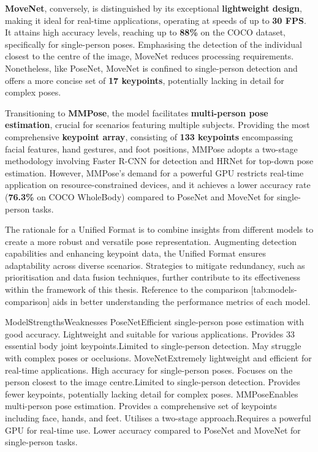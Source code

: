 {\bf MoveNet}, conversely, is distinguished by its exceptional {\bf lightweight design}, making it ideal for real-time applications, operating at speeds of up to {\bf 30 FPS}. It attains high accuracy levels, reaching up to {\bf 88\%} on the COCO dataset, specifically for single-person poses. Emphasising the detection of the individual closest to the centre of the image, MoveNet reduces processing requirements. Nonetheless, like PoseNet, MoveNet is confined to single-person detection and offers a more concise set of {\bf 17 keypoints}, potentially lacking in detail for complex poses.

Transitioning to {\bf MMPose}, the model facilitates {\bf multi-person pose estimation}, crucial for scenarios featuring multiple subjects. Providing the most comprehensive {\bf keypoint array}, consisting of {\bf 133 keypoints} encompassing facial features, hand gestures, and foot positions, MMPose adopts a two-stage methodology involving Faster R-CNN for detection and HRNet for top-down pose estimation. However, MMPose's demand for a powerful GPU restricts real-time application on resource-constrained devices, and it achieves a lower accuracy rate ({\bf 76.3\%} on COCO WholeBody) compared to PoseNet and MoveNet for single-person tasks.

The rationale for a Unified Format is to combine insights from different models to create a more robust and versatile pose representation. Augmenting detection capabilities and enhancing keypoint data, the Unified Format ensures adaptability across diverse scenarios. Strategies to mitigate redundancy, such as prioritisation and data fusion techniques, further contribute to its effectiveness within the framework of this thesis. Reference to the comparison [tab:models-comparison] aids in better understanding the performance metrics of each model.

 \setupTABLE[r][1][style=bold]
 \setupTABLE[c][1][style=bold]
 \setupTABLE[c][each][offset=3dd]
 \setupTABLE[frame=off]
 \setupTABLE[r][1][topframe=on,bottomframe=on]
 \setupTABLE[c][each][leftframe=on, align={middle,lohi}]
 \setupTABLE[c][1][leftframe=off]
 \bTR
 \bTD Model\eTD\bTD Strengths\eTD\bTD Weaknesses\eTD\eTR
 \bTR
 \bTD PoseNet\eTD\bTD Efficient single-person pose estimation with good accuracy. Lightweight and suitable for various applications. Provides 33 essential body joint keypoints.\eTD\bTD Limited to single-person detection. May struggle with complex poses or occlusions.\eTD\eTR
 \bTR
 \bTD MoveNet\eTD\bTD Extremely lightweight and efficient for real-time applications. High accuracy for single-person poses. Focuses on the person closest to the image centre.\eTD\bTD Limited to single-person detection. Provides fewer keypoints, potentially lacking detail for complex poses.\eTD\eTR
 \bTR
 \bTD MMPose\eTD\bTD Enables multi-person pose estimation. Provides a comprehensive set of keypoints including face, hands, and feet. Utilises a two-stage approach.\eTD\bTD Requires a powerful GPU for real-time use. Lower accuracy compared to PoseNet and MoveNet for single-person tasks.\eTD\eTR

